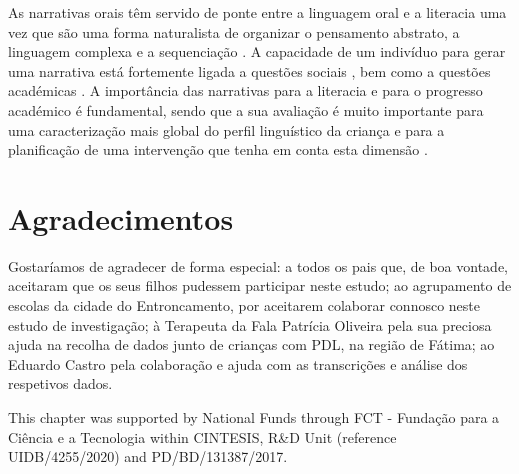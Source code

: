\documentclass[output=paper,colorlinks,citecolor=brown,booklanguage=portuguese]{langscibook}
\begin{document}
As narrativas orais têm servido de ponte entre a linguagem oral e a literacia \citep{Westby2005} uma vez que são uma forma naturalista de organizar o pensamento abstrato, a linguagem complexa e a sequenciação \citep{Petersen2011}. A capacidade de um indivíduo para gerar uma narrativa está fortemente ligada a questões sociais \citep{Cheshire2000}, bem como a questões académicas \citep{Spencer2018}. A importância das narrativas para a literacia e para o progresso académico é fundamental, sendo que a sua avaliação é muito importante para uma caracterização mais global do perfil linguístico da criança e para a planificação de uma intervenção que tenha em conta esta dimensão \citep{Fey2004, Bliss2008, Favot2020}.

\section*{Agradecimentos} 
Gostaríamos de agradecer de forma especial: a todos os pais que, de boa vontade, aceitaram que os seus filhos pudessem participar neste estudo; ao agrupamento de escolas da cidade do Entroncamento, por aceitarem colaborar connosco neste estudo de investigação; à Terapeuta da Fala Patrícia Oliveira pela sua preciosa ajuda na recolha de dados junto de crianças com PDL, na região de Fátima; ao Eduardo Castro pela colaboração e ajuda com as transcrições e análise dos respetivos dados.

This chapter was supported by National Funds through FCT - Fundação para a Ciência e a Tecnologia within CINTESIS, R\&D Unit (reference UIDB/4255/2020) and PD/BD/131387/2017.


{\sloppy\printbibliography[heading=subbibliography,notkeyword=this]}
\end{document}
